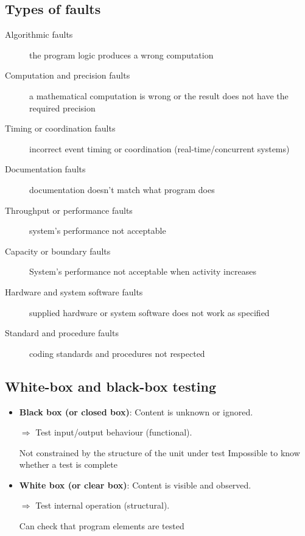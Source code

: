 \subsection{Types of faults}

\begin{description}
    \item[Algorithmic faults] the program logic produces a wrong computation
    \item[Computation and precision faults] a mathematical computation is wrong or the
    result does not have the required precision
    \item[Timing or coordination faults] incorrect event timing or
        coordination (real-time/concurrent systems)
    \item[Documentation faults] documentation doesn't match what program does
    \item[Throughput or performance faults] system's performance not acceptable
    \item[Capacity or boundary faults] System's performance not acceptable when activity
    increases
    \item[Hardware and system software faults] supplied hardware or system software does
    not work as specified
    \item[Standard and procedure faults] coding standards and procedures not respected
\end{description}

\subsection{White-box and black-box testing}

\begin{itemize}
    \item \textbf{Black box (or closed box)}: Content is unknown or ignored. 

        $\Rightarrow$ Test input/output behaviour (functional).

        \begin{itemize}
                \proitem{} Not constrained by the structure of the unit under test
                \consitem{} Impossible to know whether a test is complete
        \end{itemize}

    \item \textbf{White box (or clear box)}: Content is visible and observed. 

        $\Rightarrow$ Test internal operation (structural).

        \begin{itemize}
                \proitem{} Can check that program elements are tested
        \end{itemize}
\end{itemize}
